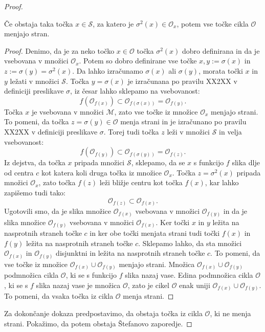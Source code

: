 \documentclass[mat2]{fmfdelo}
\begin{document}
\begin{proof}
\begin{lema}
Če obstaja taka točka $x \in \mathcal{S}$, za katero je $\sigma^2(x) \in \mathcal{O}_x$, potem vse točke cikla $\mathcal{O}$ menjajo stran.
\end{lema}
\begin{proof}
Denimo, da je za neko točko $x \in \mathcal{O}$ točka $\sigma^2(x)$ dobro definirana in da je vsebovana v množici $\mathcal{O}_x$. Potem so dobro definirane vse točke $x, y:=\sigma(x)$ in $z:=\sigma(y) = \sigma^2(x)$. Da lahko izračunamo $\sigma(x)$ ali $\sigma(y)$, morata točki $x$ in $y$ ležati v množici $\mathcal{S}$. Točka $y=\sigma(x)$ je izračunana po pravilu XX2XX v definiciji preslikave $\sigma$, iz česar lahko sklepamo na vsebovanost:
$$f(\mathcal{O}_{f(x)}) \subset \mathcal{O}_{f(\sigma(x))}=\mathcal{O}_{f(y)}.$$
Točka $x$ je vsebovana v množici $\mathcal{M}$, zato vse točke iz množice $\mathcal{O}_x$ menjajo strani. To pomeni, da točka $z = \sigma(y) \in \mathcal{O}$ menja strani in je izračunano po pravilu XX2XX v definiciji preslikave $\sigma$. Torej tudi točka $z$ leži v množici $\mathcal{S}$ in velja vsebovanost:
$$f(\mathcal{O}_{f(y)}) \subset \mathcal{O}_{f(\sigma(y))}=\mathcal{O}_{f(z)}.$$
Iz dejstva, da točka $x$ pripada množici $\mathcal{S}$, sklepamo, da se $x$ s funkcijo $f$ slika dlje od centra $c$ kot katera koli druga točka iz množice $\mathcal{O}_x$. Točka $z=\sigma^2(x)$ pripada množici $\mathcal{O}_x$, zato točka $f(z)$ leži bližje centru kot točka $f(x)$, kar lahko zapišemo tudi tako:
$$\mathcal{O}_{f(z)} \subset \mathcal{O}_{f(x)}.$$
Ugotovili smo, da je slika množice $\mathcal{O}_{f(x)}$ vsebovana v množici $\mathcal{O}_{f(y)}$ in da je slika množice $\mathcal{O}_{f(y)}$ vsebovana v množici $\mathcal{O}_{f(x)}$. Ker točki $x$ in $y$ ležita na nasprotnih straneh točke $c$ in ker obe točki menjata strani tudi točki $f(x)$ in $f(y)$ ležita na nasprotnih straneh točke $c$. Sklepamo lahko, da sta množici $\mathcal{O}_{f(x)}$ in $\mathcal{O}_{f(y)}$ disjunktni in ležita na nasprotnih straneh točke $c$. To pomeni, da vse točke iz množice $\mathcal{O}_{f(x)} \cup \mathcal{O}_{f(y)}$ menjajo strani. Množica $\mathcal{O}_{f(x)} \cup \mathcal{O}_{f(y)}$ podmnožica cikla $\mathcal{O}$, ki se s funkcijo $f$ slika nazaj vase. Edina podmnožica cikla $\mathcal{O}$, ki se s $f$ slika nazaj vase je množica $\mathcal{O}$, zato je cikel $\mathcal{O}$ enak uniji $\mathcal{O}_{f(x)} \cup \mathcal{O}_{f(y)}$. To pomeni, da vsaka točka iz cikla $\mathcal{O}$ menja strani. 
\end{proof}
Za dokončanje dokaza predpostavimo, da obstaja točka iz cikla $\mathcal{O}$, ki ne menja strani. Pokažimo, da potem obstaja Štefanovo zaporedje.

\end{proof}
\end{document}
